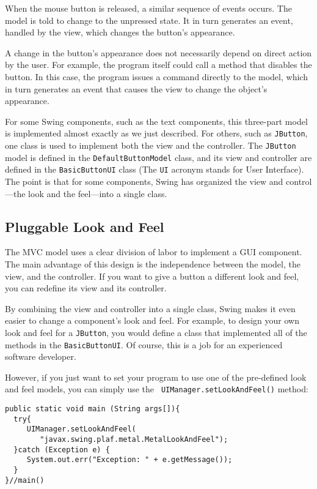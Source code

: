 When the mouse button is released, a similar sequence of events occurs.
The model is told to change to the unpressed state.  It in turn
generates an event, handled by the view, which changes the button's
appearance.

A change in the button's appearance does not necessarily depend on
direct action by the user.  For example, the program itself could call a
method that disables the button.  In this case, the program issues a
\mbox{command} \mbox{directly} to the model, which in turn generates an event that
causes the view to change the object's appearance.

For some Swing components, such as the text components, this
three-part model is implemented almost exactly as we just
described.  For others, such as {\tt JButton}, one class is used to
implement both the view and the controller.  The {\tt JButton} model is
defined in the {\tt DefaultButtonModel} class, and its view and
controller are defined in the {\tt BasicButtonUI} class (The {\tt UI}
acronym stands for User Interface).  The point is that for some
components, Swing has organized the view and control---the look and
the feel---into a single class.

\subsection{Pluggable Look and Feel}
\noindent The MVC model uses a clear division of labor to implement a GUI
component.   The main advantage of this design is the independence
between the model, the view, and the controller.  If you want to give a
button a different look and feel, you can redefine its view and its
controller.

By combining the view and controller into a single class, Swing makes
it even easier to change a component's look and feel.  For example, to
design your own look and feel for a {\tt JButton}, you would define a
class that implemented all of the methods in the
{\tt BasicButtonUI}. Of course, this is a job for an experienced software
developer.

However, if you just want to set your program to use one of the
pre-defined look and feel models, you can simply use the {\tt
UIManager.set\-LookAndFeel()} method:

\begin{jjjlisting}
\begin{lstlisting}
public static void main (String args[]){
  try{
     UIManager.setLookAndFeel(
        "javax.swing.plaf.metal.MetalLookAndFeel");
  }catch (Exception e) {
     System.out.err("Exception: " + e.getMessage());
  }
}//main()
\end{lstlisting}
\end{jjjlisting}

